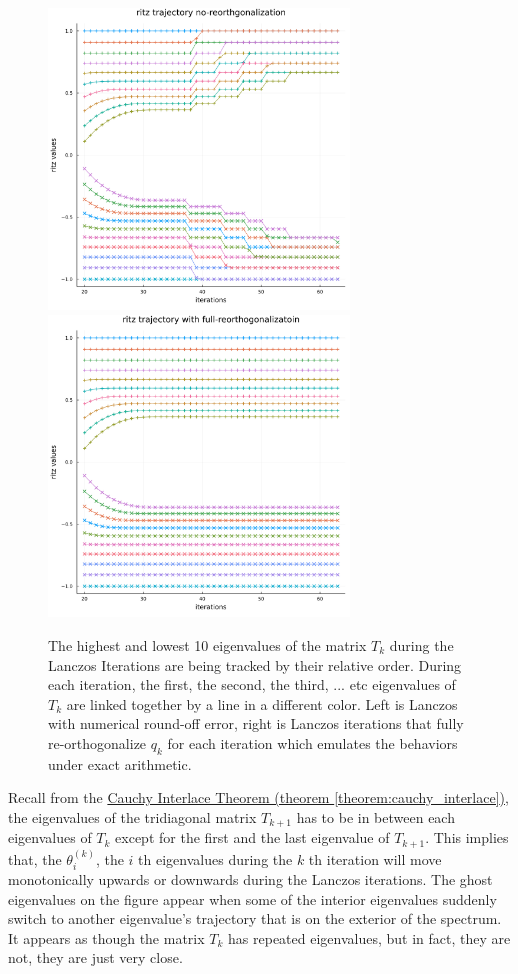 \documentclass[]{article}
\theoremstyle{definition}
\begin{document}
            \begin{figure}[H]
                \centering
                \includegraphics[width=8cm]{ritz_trajectory_plot_floats.png}
                \includegraphics[width=8cm]{ritz_trajectory_plot_exact.png}
                \caption{The highest and lowest 10 eigenvalues of the matrix $T_k$ during the Lanczos Iterations are being tracked by their relative order. During each iteration, the first, the second, the third, ... etc eigenvalues of $T_k$ are linked together by a line in a different color. Left is Lanczos with numerical round-off error, right is Lanczos iterations that fully re-orthogonalize $q_k$ for each iteration which emulates the behaviors under exact arithmetic. }
            \end{figure}\label{fig:2}
            Recall from the \hyperref[theorem:cauchy_interlace]{Cauchy Interlace Theorem (theorem \ref*{theorem:cauchy_interlace})}, the eigenvalues of the tridiagonal matrix $T_{k + 1}$ has to be in between each eigenvalues of $T_{k}$ except for the first and the last eigenvalue of $T_{k + 1}$.  This implies that, the $\theta_i^{(k)}$, the $i$ th eigenvalues during the $k$ th iteration will move monotonically upwards or downwards during the Lanczos iterations. The ghost eigenvalues on the figure appear when some of the interior eigenvalues suddenly switch to another eigenvalue's trajectory that is on the exterior of the spectrum. It appears as though the matrix $T_k$ has repeated eigenvalues, but in fact, they are not, they are just very close. 
\end{document}
